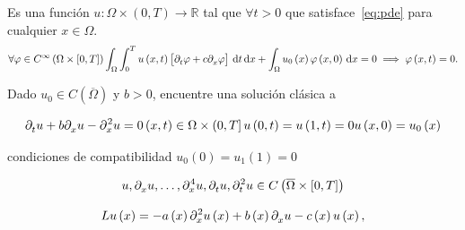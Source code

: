 \begin{definition}
	Es una función $u\colon\Omega\times\left(0,T\right)\to\mathbb{R}$ tal que $\forall t>0$
	que satisface~\eqref{eq:pde} para cualquier $x\in\Omega$.
	\begin{equation*}
		\forall\varphi\in C^{\infty}\left(\Omega\times\left[0,T\right]\right)
		\int_{\Omega}
		\int_{0}^{T}
		u\left(x,t\right)
		\left[
			\difcp{\varphi}{t}+
			c\difcp{\varphi}{x}
			\right]
		\dl t
		\dl x+
		\int_{\Omega}
		u_{0}\left(x\right)
		\varphi\left(x,0\right)
		\dl x=
		0
		\implies
		\varphi\left(x,t\right)=0.
	\end{equation*}
\end{definition}


Dado $u_{0}\in C\left(\overline{\Omega}\right)$ y $b>0$, encuentre una solución clásica a

\begin{equation*}
	\difcp{u}{t}+
	b\difcp{u}{x}-
	\difcp[2]{u}{x}=0
	\left(x,t\right)\in
	\Omega\times\left(0,T\right]
	u\left(0,t\right)=
	u\left(1,t\right)=0
	u\left(x,0\right)=
	u_{0}\left(x\right)
\end{equation*}

condiciones de compatibilidad $u_{0}\left(0\right)=u_{1}\left(1\right)=0$

\begin{equation*}
	u,
	\difcp{u}{x},\dotsc,
	\difcp[4]{u}{x},
	\difcp{u}{t},
	\difcp[2]{u}{t}\in
	C\left(\overline{\Omega}\times\left[0,T\right]\right)
\end{equation*}

\begin{equation*}
	Lu\left(x\right)=
	-a\left(x\right)
	\difcp[2]{u\left(x\right)}{x}+
	b\left(x\right)\difcp{u}{x}-
	c\left(x\right)u\left(x\right),
\end{equation*}
